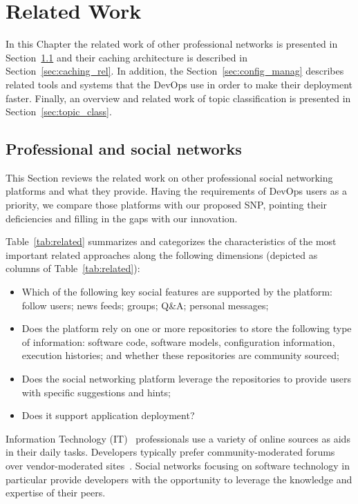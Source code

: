 \chapter{Related Work}
\label{sec:related}
In this Chapter the related work of other professional networks is presented in Section~\ref{sec:networks_rel} and their caching architecture is described in Section~\ref{sec:caching_rel}. In addition, the Section~\ref{sec:config_manag} describes related tools and systems that the DevOps use in order to make their deployment faster. Finally, an overview and related work of topic classification is presented in Section~\ref{sec:topic_class}. 

\section{Professional and social networks} 
\label{sec:networks_rel}
This Section reviews the related work on other professional social networking platforms and what they provide. Having the requirements of DevOps users as a priority, we compare those platforms with our proposed SNP, pointing their deficiencies and filling in the gaps with our innovation. 

Table~\ref{tab:related} summarizes
and categorizes the characteristics of the most important related approaches along the following dimensions
(depicted as columns of Table~\ref{tab:related}): 
\begin{itemize}
\item Which of the following key social features are supported by the platform: follow
users; news feeds; groups; Q\&A; personal messages;
\item Does the platform rely on one or more repositories
to store the following type of information: software code,
software models, configuration information, execution
histories; and whether these repositories are community sourced;
\item Does the social networking platform leverage
the repositories to provide users with specific suggestions
and hints; 
\item Does it support application deployment?
\end{itemize}

Information Technology (IT)~\cite{jorgenson1999information} professionals use a variety of online sources as aids in their daily tasks. Developers typically prefer community-moderated forums over vendor-moderated sites~\cite{evans-date}. Social networks focusing on software technology in particular provide developers with the opportunity to leverage the knowledge and expertise of their peers.
 
